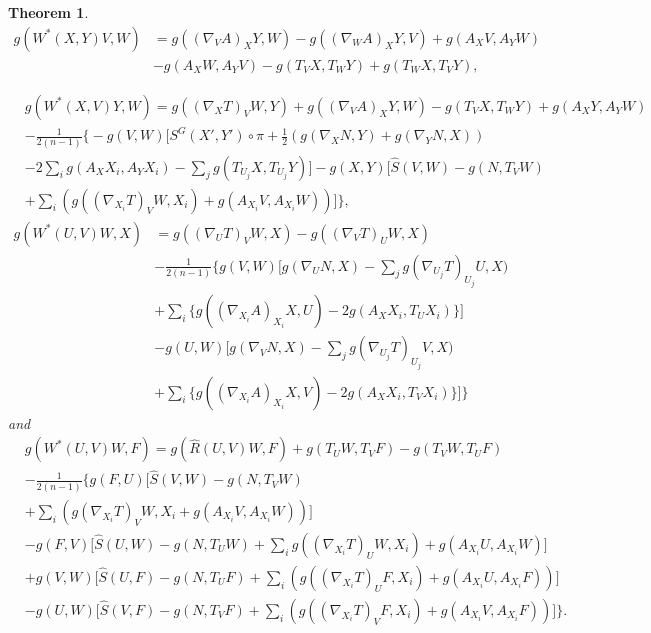 \documentclass{birkjour}
\newtheorem{theorem}{Theorem}[section]
\theoremstyle{definition}
\theoremstyle{remark}
\numberwithin{equation}{section}
\begin{document}
\begin{theorem}
	\begin{align*}
		g(W^* (X,Y)V, W)&= g((\nabla_V A)_X Y, W)- g((\nabla_W A)_X Y, V)+ g(A_X V, A_Y W)\\
		&- g(A_X W, A_Y V) - g(T_V X, T_W Y) + g(T_W X, T_V Y),
	\end{align*}
	
	\begin{align*}
		&g(W^* (X,V)Y ,W)=g((\nabla_X T)_V W, Y) + g((\nabla_V A)_X Y,W)- g(T_V X, T_W Y) + g(A_X Y, A_Y W)\\
		&-\frac{1}{2(n-1)} \bigg\{ - g(V,W) \Big[ S^G (X', Y') \circ \pi + \frac{1}{2} \left(g(\nabla_X N,Y)+ g(\nabla_Y N,X)\right) \\
		&- 2 \sum_{i} g(A_X X_i, A_Y X_i) -\sum_{j} g(T_{U_j}X, T_{U_j}Y) \Big] - g(X,Y) \Big[\hat{S} (V,W) -g(N,T_V W) \\
		&+ \sum_{i}\left(g((\nabla_{X_i}T)_V W,X_i)+ g(A_{X_i} V, A_{X_i}W)  \right) \Big] \bigg\},
	\end{align*}
	\begin{align*}
		g(W^* (U,V)W ,X)&=g((\nabla_U T)_V W, X) - g((\nabla_V T)_U W, X)\\
		& - \frac{1}{2(n-1)} \bigg\{g(V,W) \Big[g(\nabla_U N,X) -\sum_{j} g(\nabla_{U_j}T)_{U_j}U,X)  \\
		&+ \sum_{i} \{g((\nabla_{X_i}A)_{X_i} X,U)-2g(A_X {X_i}, T_U X_i)\}\Big] \\
		&- g(U,W)  \Big[g(\nabla_V N,X) -\sum_{j} g(\nabla_{U_j}T)_{U_j}V,X)  \\
		&+ \sum_{i} \{g((\nabla_{X_i}A)_{X_i} X,V)-2g(A_X {X_i}, T_V X_i)\}\Big] \bigg\}
	\end{align*}
	and
	\begin{align*}
		&g(W^* (U,V)W ,F)= g(\hat{R} (U,V)W, F) + g(T_U W, T_V F) - g(T_V W, T_U F ) \\
		&- \frac{1}{2(n-1)} \bigg\{ g(F,U) \Big[ \hat{S}(V,W)- g(N, T_V W) \\
		& + \sum_{i}\left(g(\nabla_{X_i}T)_V W, {X_i}+ g(A_{X_i}V, A_{X_i}W)\right)  \Big] \\
		&-g(F,V) \Big[ \hat{S}(U,W) -g(N,T_U W)+ \sum_{i} g((\nabla_{X_i}T)_U W, X_i)+ g(A_{X_i}U, A_{X_i}W) \Big]\\
		&+g(V,W) \Big[\hat{S}(U,F) -g(N, T_U F)+ \sum_{i}\left(g((\nabla_{X_i}T)_U F, X_i)+g(A_{X_i}U,A_{X_i}F)\right)\Big]\\
		&-g(U,W) \Big[\hat{S}(V,F)-g(N,T_V F) + \sum_{i}\left(g((\nabla_{X_i}T)_V F, X_i)+ g(A_{X_i} V, A_{X_i}F)\right)\Big] \bigg\}.
	\end{align*}
\end{theorem}
\end{document}
